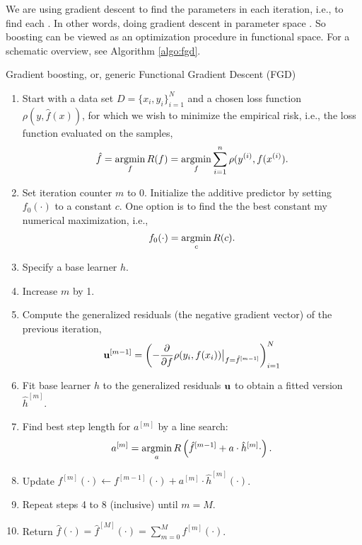 We are using gradient descent to find the parameters in each iteration, i.e., to find each . In other words, doing gradient descent in parameter space . So boosting can be viewed as an optimization procedure in functional space. For a schematic overview, see Algorithm \ref{algo:fgd}.
\begin{algorithm}
\caption{Gradient boosting, or, generic Functional Gradient Descent (FGD)}
\label{algo:fgd}
\begin{enumerate}
    \item Start with a data set $D=\{x_i, y_i\}_{i=1}^N$ and a chosen loss function $\rho(y,\hat{f}(x))$, for which we wish to
        minimize the empirical risk, i.e., the loss function evaluated on the samples,
        \begin{equation}
            \hat{f}=\operatorname*{argmin}_{f}R(f)=\operatorname*{argmin}_{f}\sum_{i=1}^n\rho(y^{(i)},f(x^{(i)}).
        \end{equation}
    \item Set iteration counter $m$ to 0. Initialize the additive predictor by setting $f_0(\cdot)$ to a constant $c$. One option is to find the the best constant my numerical maximization, i.e.,
        \begin{equation}
            f_0(\cdot)=\operatorname*{argmin}_c R(c).
        \end{equation}
    \item Specify a base learner $h$.
    \item Increase $m$ by 1.
    \item Compute the generalized residuals (the negative gradient vector) of the previous iteration,
        \begin{equation}
            \mathbf{u}^{[m-1]}=\left(-\frac{\partial}{\partial f}\rho(y_i, f(x_i))\big\rvert_{f=\hat{f}^{[m-1]}}\right)_{i=1}^N
        \end{equation}
    \item Fit base learner $h$ to the generalized residuals $\mathbf{u}$ to obtain a fitted version $\hat{h}^{[m]}$.
    \item Find best step length for $a^{[m]}$ by a line search:
        \begin{equation*}
            a^{[m]}=\operatorname*{argmin}_{a}R\left(\hat{f}^{[m-1]}+a\cdot\hat{h}^{[m]}{\cdot}\right).
        \end{equation*}
    \item Update $f^{[m]}(\cdot)\gets f^{[m-1]}(\cdot)+a^{[m]}\cdot \hat{h}^{[m]}(\cdot)$.
    \item Repeat steps 4 to 8 (inclusive) until $m=M$.
    \item Return $\hat{f}(\cdot)=\hat{f}^{[M]}(\cdot)=\sum_{m=0}^{M}f^{[m]}(\cdot)$.
\end{enumerate}
\end{algorithm}

